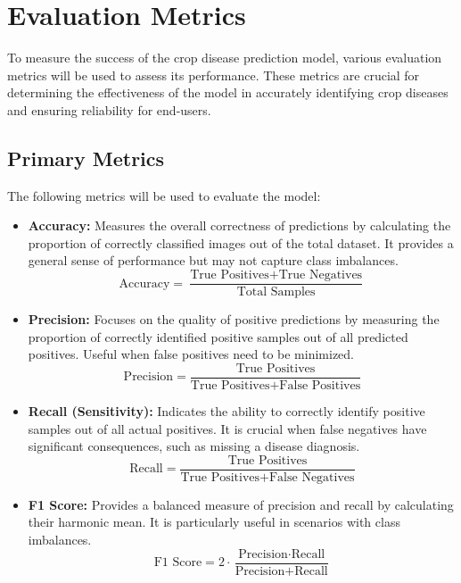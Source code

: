 \section{Evaluation Metrics}
To measure the success of the crop disease prediction model, various evaluation metrics will be used to assess its performance. These metrics are crucial for determining the effectiveness of the model in accurately identifying crop diseases and ensuring reliability for end-users.

\subsection{Primary Metrics}
The following metrics will be used to evaluate the model:
\begin{itemize}
    \item \textbf{Accuracy:} Measures the overall correctness of predictions by calculating the proportion of correctly classified images out of the total dataset. It provides a general sense of performance but may not capture class imbalances.
    \[
    \text{Accuracy} = \frac{\text{True Positives} + \text{True Negatives}}{\text{Total Samples}}
    \]

    \item \textbf{Precision:} Focuses on the quality of positive predictions by measuring the proportion of correctly identified positive samples out of all predicted positives. Useful when false positives need to be minimized.
    \[
    \text{Precision} = \frac{\text{True Positives}}{\text{True Positives} + \text{False Positives}}
    \]

    \item \textbf{Recall (Sensitivity):} Indicates the ability to correctly identify positive samples out of all actual positives. It is crucial when false negatives have significant consequences, such as missing a disease diagnosis.
    \[
    \text{Recall} = \frac{\text{True Positives}}{\text{True Positives} + \text{False Negatives}}
    \]

    \item \textbf{F1 Score:} Provides a balanced measure of precision and recall by calculating their harmonic mean. It is particularly useful in scenarios with class imbalances.
    \[
    \text{F1 Score} = 2 \cdot \frac{\text{Precision} \cdot \text{Recall}}{\text{Precision} + \text{Recall}}
    \]

\end{itemize}

